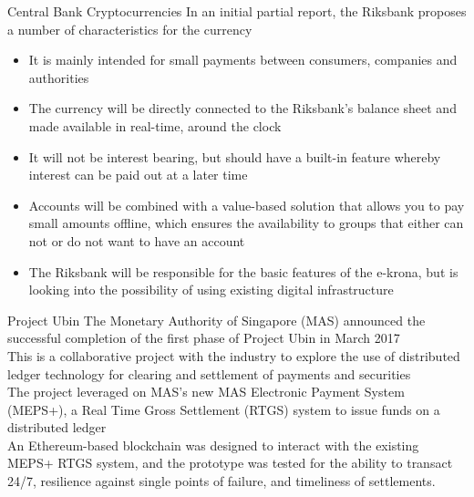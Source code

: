 \documentclass[10pt]{beamer}
\begin{document}
\begin{frame}{Central Bank Cryptocurrencies}
	In an initial partial report, the Riksbank proposes a number of characteristics for the currency
	\begin{itemize}
		\item It is mainly intended for small payments between consumers, companies and authorities
		\item The currency will be directly connected to the Riksbank's balance sheet and made available in real-time, around the clock
		\item It will not be interest bearing, but should have a built-in feature whereby interest can be paid out at a later time
		\item Accounts will be combined with a value-based solution that allows you to pay small amounts offline, which ensures the availability to groups that either can not or do not want to have an account
		\item The Riksbank will be responsible for the basic features of the e-krona, but is looking into the possibility of using existing digital infrastructure
	\end{itemize}
\end{frame}


\begin{frame}{Project Ubin}
	The Monetary Authority of Singapore (MAS) announced the successful completion of the first phase of Project Ubin in March 2017\\ \vspace{3mm}
	This is a collaborative project with the industry to explore the use of distributed ledger technology for clearing and settlement of payments and securities \\ \vspace{3mm}
	The project leveraged on MAS's new MAS Electronic Payment System (MEPS+), a Real Time Gross Settlement (RTGS) system to issue funds on a distributed ledger \\ \vspace{3mm}
	An Ethereum-based blockchain was designed to interact with the existing MEPS+ RTGS system, and the prototype was tested for the ability to transact 24/7, resilience against single points of failure, and timeliness of settlements.
\end{frame}

\end{document}
